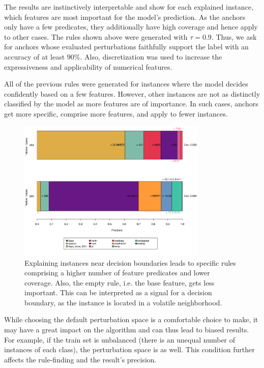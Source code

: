 \documentclass[
  11pt,
]{scrbook}
\begin{document}
The results are instinctively interpretable and show for each explained instance, which features are most important for the model's prediction. As the anchors only have a few predicates, they additionally have high coverage and hence apply to other cases.
The rules shown above were generated with \(\tau = 0.9\). Thus, we ask for anchors whose evaluated perturbations faithfully support the label with an accuracy of at least \(90\%\). Also, discretization was used to increase the expressiveness and applicability of numerical features.

All of the previous rules were generated for instances where the model decides confidently based on a few features. However, other instances are not as distinctly classified by the model as more features are of importance. In such cases, anchors get more specific, comprise more features, and apply to fewer instances.

\begin{figure}

{\centering \includegraphics[width=0.8\textwidth]{images/unnamed-chunk-34-1} 

}

\caption{Explaining instances near decision boundaries leads to specific rules comprising a higher number of feature predicates and lower coverage. Also, the empty rule, i.e. the base feature, gets less important. This can be interpreted as a signal for a decision boundary, as the instance is located in a volatile neighborhood.}\label{fig:unnamed-chunk-34}
\end{figure}

While choosing the default perturbation space is a comfortable choice to make, it may have a great impact on the algorithm and can thus lead to biased results. For example, if the train set is unbalanced (there is an unequal number of instances of each class), the perturbation space is as well. This condition further affects the rule-finding and the result's precision.
\end{document}
